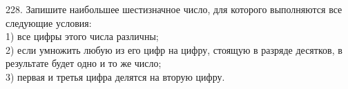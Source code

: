 228. Запишите наибольшее шестизначное число, для которого выполняются все следующие условия:\\
1) все цифры этого числа различны;\\
2) если умножить любую из его цифр на цифру, стоящую в разряде десятков, в результате будет одно и то же число;\\
3) первая и третья цифра делятся на вторую цифру.\\
